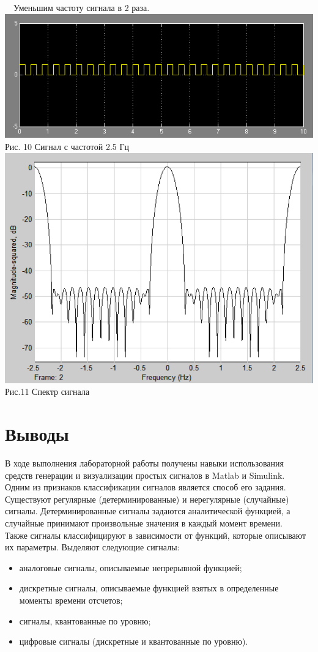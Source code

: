 \documentclass[a4paper]{article}
\begin{document}
~\
\flushleft Уменьшим частоту сигнала в 2 раза.
\center\includegraphics[scale = 0.8]{square_sim2.png} \\ Рис. 10 Сигнал с частотой 2.5 Гц \\ 
\center\includegraphics[scale = 0.7]{square_sp2.png} \\ Рис.11 Спектр сигнала \\

\flushleft \section{Выводы}
В ходе выполнения лабораторной работы получены навыки использования средств генерации и визуализации простых сигналов в Matlab и Simulink.\\

Одним из признаков классификации сигналов является способ его задания. Существуют регулярные (детерминированные) и нерегулярные (случайные) сигналы. Детерминированные сигналы задаются аналитической функцией, а случайные принимают произвольные значения в каждый момент времени.\\

Также сигналы классифицируют в зависимости от функций, которые описывают их параметры. Выделяют следующие сигналы:
\begin{itemize}
	\item аналоговые сигналы, описываемые непрерывной функцией;
	\item дискретные сигналы, описываемые функцией взятых в определенные моменты времени отсчетов;
	\item сигналы, квантованные по уровню;
	\item цифровые сигналы (дискретные и квантованные по уровню).
\end{itemize}
\end{document}
